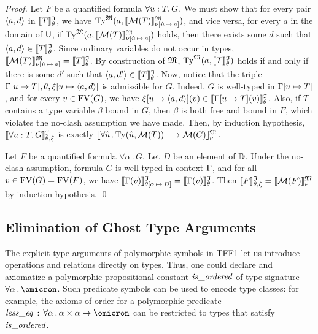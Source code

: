 \begin{proof}
Let $F$ be a quantified formula $\forall u \mathrel{:} T .\, G$.
We must show that for every pair $\langle a,d \rangle$ in $\llbracket T\rrbracket^{\mathfrak{I}}_{\theta}$, we have
$\mathrm{Ty}^{\mathfrak{M}}(a, \llbracket \mathcal{M}(T) \rrbracket^{\mathfrak{M}}_{\nu[\hat{u}\,\mapsto\,a]})$,
and vice versa, for every $a$ in the domain of $\mathsf{U}$, if
$\mathrm{Ty}^{\mathfrak{M}}(a, \llbracket \mathcal{M}(T) \rrbracket^{\mathfrak{M}}_{\nu[\hat{u}\,\mapsto\,a]})$
holds, then there exists some $d$ such that $\langle a,d \rangle \in
\llbracket T\rrbracket^{\mathfrak{I}}_{\theta}$.
%
Since ordinary variables do not occur in types,
$\llbracket \mathcal{M}(T) \rrbracket^{\mathfrak{M}}_{\nu[\hat{u}\,\mapsto\,a]} =
\llbracket T \rrbracket^{\mathfrak{I}}_\theta$.
By construction of $\mathfrak{M}$,
$\mathrm{Ty}^{\mathfrak{M}}(a, \llbracket T \rrbracket^{\mathfrak{I}}_\theta)$
holds if and only if there is some $d'$ such that
$\langle a,d' \rangle \in \llbracket T \rrbracket^{\mathfrak{I}}_\theta$.
%
Now, notice that the triple $\mathrm{\Gamma}[u \mapsto T],
\theta,\xi[u \mapsto \langle a,d \rangle]$ is admissible for $G$.
Indeed, $G$ is well-typed in $\mathrm{\Gamma}[u \mapsto T]$,
and for every $v \in \mathrm{FV}(G)$, we have
$\xi[u \mapsto \langle a,d \rangle](v) \in \llbracket\mathrm{\Gamma}[u \mapsto T](v)\rrbracket^{\mathfrak{I}}_{\theta}$.
Also, if $T$ contains a type variable $\beta$ bound in $G$,
then $\beta$ is both free and bound in $F$, which violates
the no-clash assumption we have made.
%
Then, by induction hypothesis, $\llbracket\forall u \mathrel{:} T .\, G\rrbracket^{\mathfrak{I}}_{\theta,\xi}$
is exactly $\llbracket \forall \hat{u} \,.\, \mathrm{Ty}(\hat{u},\mathcal{M}(T))
\longrightarrow \mathcal{M}(G) \rrbracket^{\mathfrak{M}}_{\nu}$.

Let $F$ be a quantified formula $\forall \alpha \,.\, G$.
Let $D$ be an element of $\mathbb{D}$. Under the no-clash assumption,
formula $G$ is well-typed in context $\mathrm{\Gamma}$, and for all
$v \in \mathrm{FV}(G) = \mathrm{FV}(F)$, we have
$\llbracket\mathrm{\Gamma}(v)\rrbracket^{\mathfrak{I}}_{\theta[\alpha\,\mapsto\,D]} = \llbracket\mathrm{\Gamma}(v)\rrbracket^{\mathfrak{I}}_{\theta}$.
Then $\llbracket F\rrbracket^{\mathfrak{I}}_{\theta,\xi} = \llbracket \mathcal{M}(F) \rrbracket^{\mathfrak{M}}_{\nu}$ by induction hypothesis.
\qed
\end{proof}

\subsection{Elimination of Ghost Type Arguments} \label{ssec:ghost}
The explicit type arguments of polymorphic symbols
in TFF1 let us introduce operations and relations directly on types.
Thus, one could declare and axiomatize a polymorphic propositional
constant $\mathit{is\_ordered}$ of type signature $\forall\alpha\,.\,\omicron$.
Such predicate symbols can be used to encode type classes:
for example, the axioms of order for a polymorphic predicate
$\sym{less\_eq} \,\ty\, \forall\alpha\,.\,\alpha\times\alpha\to\omicron$
can be restricted to types that satisfy $\mathit{is\_ordered}$.

